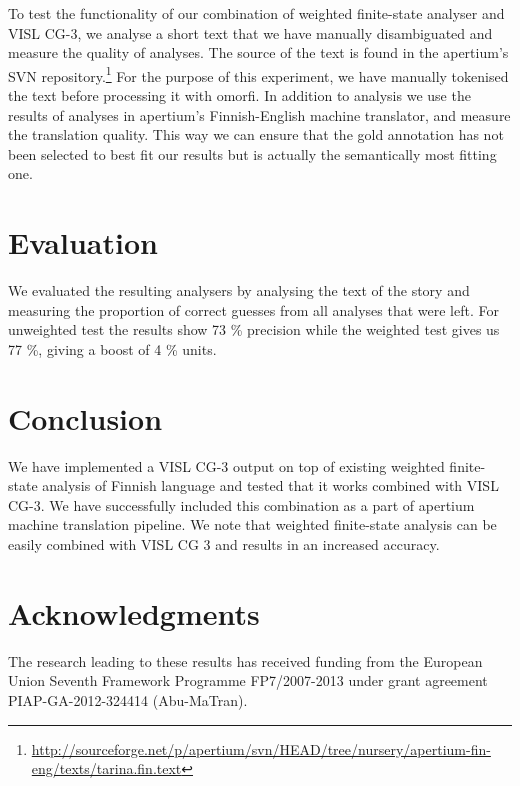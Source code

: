 \documentclass[11pt]{article}
\begin{document}
To test the functionality of our combination of weighted
finite-state analyser and VISL CG-3, we analyse a short text that we have
manually disambiguated and measure the quality of analyses. The source of the
text is found in the apertium's SVN
repository.\footnote{\url{http://sourceforge.net/p/apertium/svn/HEAD/tree/nursery/apertium-fin-eng/texts/tarina.fin.text}}
For the purpose of this experiment, we have manually tokenised the text
before processing it with omorfi.
In addition to analysis we use the results of analyses in apertium's
Finnish-English machine translator, and measure the translation quality. This
way we can ensure that the gold annotation has not been selected to best fit
our results but is actually the semantically most fitting one.

\section{Evaluation}

We evaluated the resulting analysers by analysing the text of the story and
measuring the proportion of correct guesses from all analyses that were left.
For unweighted test the results show 73 \% precision while the weighted test
gives us 77 \%, giving a boost of 4 \% units.

\section{Conclusion}

We have implemented a VISL CG-3 output on top of existing weighted finite-state
analysis of Finnish language and tested that it works combined with VISL CG-3.
We have successfully included this combination as a part of apertium machine
translation pipeline. We note that weighted finite-state analysis can be
easily combined with VISL CG 3 and results in an increased accuracy.

\section*{Acknowledgments}

The research leading to these results has received
funding from the European Union Seventh Framework
Programme FP7/2007-2013 under grant agreement
PIAP-GA-2012-324414 (Abu-MaTran).




\end{document}
